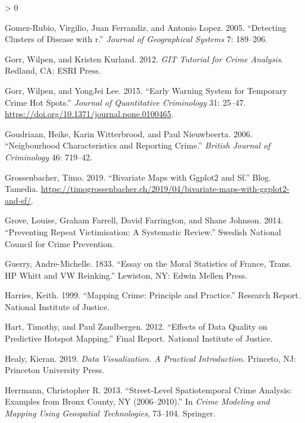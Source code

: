 \documentclass[
  krantz2]{krantz}
\newlength{\cslhangindent}
\newenvironment{CSLReferences}[2] %
 {%
  \setlength{\parindent}{0pt}
  \ifodd #1 \everypar{\setlength{\hangindent}{\cslhangindent}}\ignorespaces\fi
  \ifnum #2 > 0
  \setlength{\parskip}{#2\baselineskip}
  \fi
 }%
 {}
\begin{document}
\begin{CSLReferences}{1}{0}
\leavevmode\hypertarget{ref-Gomez_2005}{}%
Gomez-Rubio, Virgilio, Juan Ferrandiz, and Antonio Lopez. 2005. {``Detecting Clusters of Disease with r.''} \emph{Journal of Geographical Systems} 7: 189--206.

\leavevmode\hypertarget{ref-Gorr_2012}{}%
Gorr, Wilpen, and Kristen Kurland. 2012. \emph{GIT Tutorial for Crime Analysis}. Redland, CA: ESRI Press.

\leavevmode\hypertarget{ref-Gorr_2015}{}%
Gorr, Wilpen, and YongJei Lee. 2015. {``Early Warning System for Temporary Crime Hot Spots.''} \emph{Journal of Quantitative Criminology} 31: 25--47. \url{https://doi.org/10.1371/journal.pone.0100465}.

\leavevmode\hypertarget{ref-Goudriaan_2006}{}%
Goudriaan, Heike, Karin Witterbrood, and Paul Nieuwbeerta. 2006. {``Neigbourhood Characteristics and Reporting Crime.''} \emph{British Journal of Criminology} 46: 719--42.

\leavevmode\hypertarget{ref-Grossenbacher_2019}{}%
Grossenbacher, Timo. 2019. {``Bivariate Maps with Ggplot2 and Sf.''} Blog. Tamedia. \url{https://timogrossenbacher.ch/2019/04/bivariate-maps-with-ggplot2-and-sf/}.

\leavevmode\hypertarget{ref-Grove_2014}{}%
Grove, Louise, Graham Farrell, David Farrington, and Shane Johnson. 2014. {``Preventing Repeat Victimisation: A Systematic Review.''} Swedish National Council for Crime Prevention.

\leavevmode\hypertarget{ref-Guerry_1833}{}%
Guerry, Andre-Michelle. 1833. {``Essay on the Moral Statistics of France, Trans. HP Whitt and VW Reinking.''} Lewiston, NY: Edwin Mellen Press.

\leavevmode\hypertarget{ref-Harries_1999}{}%
Harries, Keith. 1999. {``Mapping Crime: Principle and Practice.''} Research Report. National Institute of Justice.

\leavevmode\hypertarget{ref-Hart_2012}{}%
Hart, Timothy, and Paul Zandbergen. 2012. {``Effects of Data Quality on Predictive Hotspot Mapping.''} Final Report. National Institute of Justice.

\leavevmode\hypertarget{ref-Healy_2019}{}%
Healy, Kieran. 2019. \emph{Data Visualization. A Practical Introduction}. Princeto, NJ: Princeton University Press.

\leavevmode\hypertarget{ref-Herrmann_2013}{}%
Herrmann, Christopher R. 2013. {``Street-Level Spatiotemporal Crime Analysis: Examples from Bronx County, NY (2006--2010).''} In \emph{Crime Modeling and Mapping Using Geospatial Technologies}, 73--104. Springer.


\end{CSLReferences}
\end{document}
